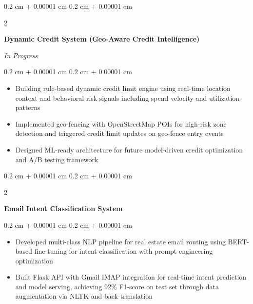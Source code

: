 \documentclass[10pt, letterpaper]{article}
\newenvironment{highlights}{
    \begin{itemize}[
        topsep=0.10 cm,
        parsep=0.10 cm,
        partopsep=0pt,
        itemsep=0pt,
        leftmargin=0.4 cm + 10pt
    ]
}{
    \end{itemize}
}
\newenvironment{onecolentry}{
    \begin{adjustwidth}{
        0.2 cm + 0.00001 cm
    }{
        0.2 cm + 0.00001 cm
    }
}{
    \end{adjustwidth}
}
\newenvironment{twocolentry}[2][]{
    \onecolentry
    \def\secondColumn{#2}
    \setcolumnwidth{\fill, 4.5 cm}
    \begin{paracol}{2}
}{
    \switchcolumn \raggedleft \secondColumn
    \end{paracol}
    \endonecolentry
}
\let\hrefWithoutArrow\href
\renewcommand{\href}[2]{\hrefWithoutArrow{#1}{\ifthenelse{\equal{#2}{}}{ }{#2 }\raisebox{.15ex}{\footnotesize \faExternalLink*}}}
\begin{document}
        \vspace{0.1 cm}

        \begin{twocolentry}{\textit{In Progress}}
            \textbf{Dynamic Credit System (Geo-Aware Credit Intelligence)}
        \end{twocolentry}
        \vspace{0.05 cm}
        \begin{onecolentry}
            \begin{highlights}
                \item Building rule-based dynamic credit limit engine using real-time location context and behavioral risk signals including spend velocity and utilization patterns
                \item Implemented geo-fencing with OpenStreetMap POIs for high-risk zone detection and triggered credit limit updates on geo-fence entry events
                \item Designed ML-ready architecture for future model-driven credit optimization and A/B testing framework
            \end{highlights}
        \end{onecolentry}

        \begin{twocolentry}{\textit{\href{https://github.com/zardat/Email-Intent-Classification-}{GitHub}}}
            \textbf{Email Intent Classification System}
        \end{twocolentry}
        \vspace{0.05 cm}
        \begin{onecolentry}
            \begin{highlights}
                \item Developed multi-class NLP pipeline for real estate email routing using BERT-based fine-tuning for intent classification with prompt engineering optimization
                \item Built Flask API with Gmail IMAP integration for real-time intent prediction and model serving, achieving 92\% F1-score on test set through data augmentation via NLTK and back-translation
            \end{highlights}
        \end{onecolentry}

        \vspace{0.1 cm}
\end{document}
